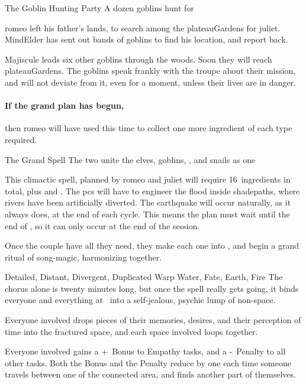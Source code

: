 \begin{multicols}{2}
{The Goblin Hunting Party}%
{A dozen goblins hunt for }%

\Gls{romeo} left his father's lands, to search among the \gls{plateauGardens} for \gls{juliet}.
\Gls{MindElder} has sent out bands of goblins to find his location, and report back.

Majiscule leads six other goblins through the woods.
Soon they will reach \gls{plateauGardens}.
The goblins speak frankly with the troupe about their mission, and will not deviate from it, even for a moment, unless their lives are in danger.

\paragraph{If the grand plan has begun,}
then \gls{romeo} will have used this time to collect one more \gls{ingredient} of each type required.

{The Grand Spell}%
{The two unite the elves, goblins, , and snails as one}%
\label{grandSpell}

This climactic spell, planned by \gls{romeo} and \gls{juliet} will require 16~\glspl{ingredient} in total, plus  and .
The \glspl{pc} will have to engineer the \gls{flood} inside \gls{shadepaths}, where rivers have been artificially diverted.
The \gls{earthquake} will occur naturally, as it always does, at the end of each \gls{cycle}.
This means the plan must wait until the end of \showCycle, so it can only occur at the end of the session.

Once the couple have all they need, they make each one into , and begin a grand ritual of song-magic, harmonizing together.

  {Detailed, Distant, Divergent, Duplicated}%
  {Warp}%
  {Water, Fate, Earth, Fire}%
  {}%
  {The chorus alone is twenty minutes long, but once the spell really gets going, it binds everyone and everything at \spellRange\ into a self-jealous, psychic lump of non-space.}%
  {Everyone involved drops pieces of their memories, desires, and their perception of time into the fractured space, and each space involved loops together.

  Everyone involved gains a +~Bonus to Empathy tasks, and a -~Penalty to all other tasks.
  Both the Bonus and the Penalty reduce by one each time someone travels between one of the connected area, and finds another part of themselves.}


\end{multicols}
